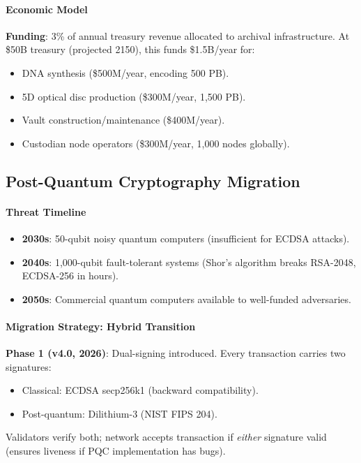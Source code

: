 \documentclass[11pt]{article}
\begin{document}
\paragraph{Economic Model}
\textbf{Funding}: 3\% of annual treasury revenue allocated to archival infrastructure. At \$50B treasury (projected 2150), this funds \$1.5B/year for:
\begin{itemize}[noitemsep]
  \item DNA synthesis (\$500M/year, encoding 500 PB).
  \item 5D optical disc production (\$300M/year, 1,500 PB).
  \item Vault construction/maintenance (\$400M/year).
  \item Custodian node operators (\$300M/year, 1,000 nodes globally).
\end{itemize}

\subsection{Post-Quantum Cryptography Migration}

\paragraph{Threat Timeline}
\begin{itemize}[noitemsep]
  \item \textbf{2030s}: 50-qubit noisy quantum computers (insufficient for ECDSA attacks).
  \item \textbf{2040s}: 1,000-qubit fault-tolerant systems (Shor's algorithm breaks RSA-2048, ECDSA-256 in hours).
  \item \textbf{2050s}: Commercial quantum computers available to well-funded adversaries.
\end{itemize}

\paragraph{Migration Strategy: Hybrid Transition}
\textbf{Phase 1 (v4.0, 2026)}: Dual-signing introduced. Every transaction carries two signatures:
\begin{itemize}[noitemsep]
  \item Classical: ECDSA secp256k1 (backward compatibility).
  \item Post-quantum: Dilithium-3 (NIST FIPS 204).
\end{itemize}
Validators verify both; network accepts transaction if \emph{either} signature valid (ensures liveness if PQC implementation has bugs).
\end{document}
